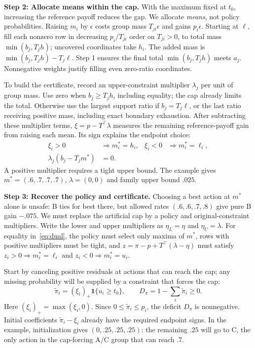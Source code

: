 \textbf{Step 2: Allocate means within the cap.}
With the maximum fixed at $t_0$, increasing the reference payoff reduces the gap. We allocate \emph{means}, not policy probabilities. Raising $m_i$ by $\epsilon$ costs group mass $T_{ji}\epsilon$ and gains $p_i\epsilon$. Starting at $\ell$, fill each nonzero row in decreasing $p_i/T_{ji}$ order on $T_{ji}>0$, to total mass $\min(b_j,T_jh)$; uncovered coordinates take $h_i$. The added mass is $\min(b_j,T_jh)-T_j\ell$. Step 1 ensures the final total $\min(b_j,T_jh)$ meets $a_j$. Nonnegative weights justify filling even zero-ratio coordinates.

To build the certificate, record an upper-constraint multiplier $\lambda_j$ per unit of group mass. Use zero when $b_j\ge T_jh$, including equality; the cap already limits the total. Otherwise use the largest support ratio if $b_j=T_j\ell$, or the last ratio receiving positive mass, including exact boundary exhaustion. After subtracting these multiplier terms, $\xi=p-T^\top\lambda$ measures the remaining reference-payoff gain from raising each mean. Its sign explains the endpoint choice:
\[
 \begin{aligned}
 \xi_i>0&\Rightarrow m_i^*=h_i,&
 \xi_i<0&\Rightarrow m_i^*=\ell_i,\\
 \lambda_j(b_j-T_jm^*)&=0.
 \end{aligned}
\]
A positive multiplier requires a tight upper bound. The example gives $m^*=(.6,.7,.7,.7)$, $\lambda=(0,0)$ and family upper bound $.025$.

\textbf{Step 3: Recover the policy and certificate.}
Choosing a best action at $m^*$ alone is unsafe: B ties for best there, but allowed rates $(.6,.6,.7,.8)$ give pure B gain $-.075$. We must replace the artificial cap by a policy and original-constraint multipliers. Write the lower and upper multipliers as $\eta_L=\eta$ and $\eta_U=\lambda$. For equality in~\eqref{eq:dual}, the policy must select only maxima of $m^*$, rows with positive multipliers must be tight, and $z=\pi-p+T^\top(\lambda-\eta)$ must satisfy $z_i>0\Rightarrow m_i^*=\ell_i$ and $z_i<0\Rightarrow m_i^*=u_i$.

Start by canceling positive residuals at actions that can reach the cap; any missing probability will be supplied by a constraint that forces the cap:
\[
 \widetilde\pi_i=(\xi_i)_+\mathbf1\{u_i\ge t_0\},\qquad
 D_\pi=1-\sum_i\widetilde\pi_i\ge0.
\]
Here $(\xi_i)_+=\max(\xi_i,0)$. Since $0\le\widetilde\pi_i\le p_i$, the deficit $D_\pi$ is nonnegative. Initial coefficients $\widetilde\pi_i-\xi_i$ already have the required endpoint signs. In the example, initialization gives $(0,.25,.25,.25)$: the remaining $.25$ will go to C, the only action in the cap-forcing A/C group that can reach $.7$.

